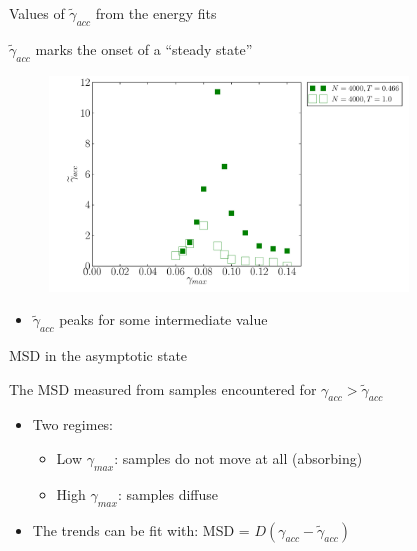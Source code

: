 \documentclass[compress]{beamer}
\begin{document}
	\begin{frame}{Values of $\widetilde \gamma_{acc}$ from the energy fits}
	
		$\widetilde \gamma_{acc}$ marks the onset of a ``steady state''

		\begin{figure}
			\includegraphics[width=0.85\textwidth]{Graphics/Graphs/Epeaks}
		\end{figure}
		
		\begin{itemize}
			\item $\widetilde \gamma_{acc}$ peaks for some intermediate value
		\end{itemize}
		
	\end{frame}


	\begin{frame}{MSD in the asymptotic state}

		The MSD measured from samples encountered for $\gamma_{acc} > \widetilde \gamma_{acc}$

		\begin{figure}
		\end{figure}
		
		\begin{itemize}
			\item<1-> Two regimes:
				\begin{itemize}
					\item<1-> Low $\gamma_{max}$: samples do not move at all (absorbing)
					\item<2-> High $\gamma_{max}$: samples diffuse
				\end{itemize}
			\item<3-> The trends can be fit with: MSD = $D (\gamma_{acc} - \widetilde \gamma_{acc})$ 
		\end{itemize}
		
	\end{frame}
\end{document}
